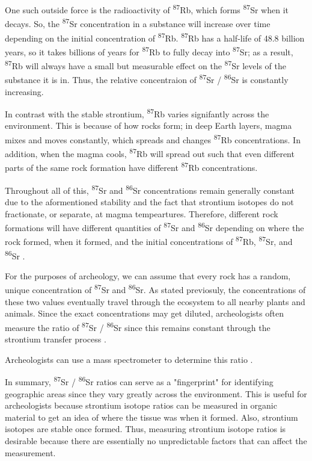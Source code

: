\documentclass[a4paper, 12pt]{article}
\begin{document}
One such outside force is the radioactivity of \textsuperscript{87}Rb, which forms \textsuperscript{87}Sr when it decays. So, the \textsuperscript{87}Sr concentration in a substance
will increase over time depending on the initial concentration of \textsuperscript{87}Rb.
\textsuperscript{87}Rb has a half-life of 48.8 billion years, so it takes billions of years
for \textsuperscript{87}Rb to fully decay into \textsuperscript{87}Sr; as a result, \textsuperscript{87}Rb will always
have a small but measurable effect on the \textsuperscript{87}Sr levels of the substance it is in.
Thus, the relative concentraion of \textsuperscript{87}Sr / \textsuperscript{86}Sr is constantly increasing.

In contrast with the stable strontium, \textsuperscript{87}Rb varies signifantly across the environment.
This is because of how rocks form; in deep Earth layers, magma mixes and moves constantly, which spreads and changes \textsuperscript{87}Rb concentrations.
In addition, when the magma cools,
\textsuperscript{87}Rb will spread out such that even different parts of the same
rock formation have different \textsuperscript{87}Rb concentrations.

Throughout all of this, \textsuperscript{87}Sr and \textsuperscript{86}Sr concentrations remain
generally constant due to the aformentioned stability and the fact that strontium isotopes
do not fractionate, or separate, at magma tempeartures.
Therefore, different rock formations will have different quantities of
\textsuperscript{87}Sr and \textsuperscript{86}Sr depending on where the rock formed,
when it formed, and the initial concentrations of \textsuperscript{87}Rb, \textsuperscript{87}Sr, and \textsuperscript{86}Sr \citep{Long1998}.

For the purposes of archeology, we can assume that every rock has a random, unique
concentration of \textsuperscript{87}Sr and \textsuperscript{86}Sr. As stated previosuly,
the concentrations of these two values eventually travel through the ecosystem to all nearby
plants and animals. Since the exact concentrations may get diluted, archeologists often
measure the ratio of \textsuperscript{87}Sr / \textsuperscript{86}Sr since this
remains constant through the strontium transfer process \citep{bartelink2019}.

Archeologists can use a mass spectrometer to determine this ratio \citep{Long1998}.

In summary, \textsuperscript{87}Sr / \textsuperscript{86}Sr ratios can serve as a
"fingerprint" for identifying geographic areas since they vary greatly
across the environment. This is useful for archeologists because strontium isotope ratios
can be measured in organic material to get an idea of where the tissue was when it formed.
Also, strontium isotopes are stable once formed. Thus, measuring strontium isotope ratios is
desirable because there are essentially no unpredictable
factors that can affect the measurement.
\end{document}
